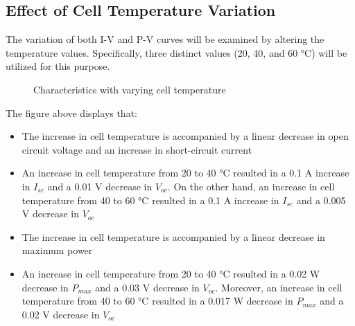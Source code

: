 \documentclass{report}
\begin{document}
\subsection{Effect of Cell Temperature Variation}

The variation of both I-V and P-V curves will be examined by altering the temperature values. Specifically, three distinct values (20, 40, and 60 °C) will be utilized for this purpose.

\begin{figure}[h!]
  \centering
  \hfill
  \caption{Characteristics with varying cell temperature}
\end{figure}


The figure above displays that:
\begin{itemize}
    \item The increase in cell temperature is accompanied by a linear decrease in open circuit voltage and an increase in short-circuit current
    \item  An increase in cell temperature from 20 to 40 °C resulted in a 0.1 A increase in $I_{sc}$ and a 0.01 V decrease in $V_{oc}$. On the other hand, an increase in cell temperature from 40 to 60 °C resulted in a 0.1 A increase in $I_{sc}$ and a 0.005 V decrease in $V_{oc}$
    \item The increase in cell temperature is accompanied by a linear decrease in maximum power \newpage
    \item  An increase in cell temperature from 20 to 40 °C resulted in a 0.02 W decrease in $P_{max}$ and a 0.03 V decrease in $V_{oc}$. Moreover, an increase in cell temperature from 40 to 60 °C resulted in a 0.017 W decrease in $P_{max}$ and a 0.02 V decrease in $V_{oc}$
\end{itemize}
\end{document}
